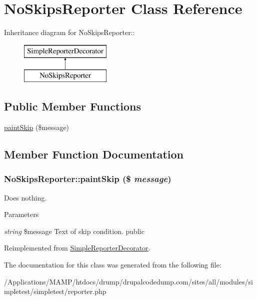 \hypertarget{class_no_skips_reporter}{
\section{NoSkipsReporter Class Reference}
\label{class_no_skips_reporter}
}
Inheritance diagram for NoSkipsReporter::\begin{figure}[H]
\begin{center}
\leavevmode
\includegraphics[height=2cm]{class_no_skips_reporter}
\end{center}
\end{figure}
\subsection*{Public Member Functions}
\begin{DoxyCompactItemize}
\item 
\hyperlink{class_no_skips_reporter_ab632d4c0baf0fc36a44c3ed6c3a3d1a4}{paintSkip} (\$message)
\end{DoxyCompactItemize}


\subsection{Member Function Documentation}
\hypertarget{class_no_skips_reporter_ab632d4c0baf0fc36a44c3ed6c3a3d1a4}{
\subsubsection[{paintSkip}]{\setlength{\rightskip}{0pt plus 5cm}NoSkipsReporter::paintSkip (\$ {\em message})}}
\label{class_no_skips_reporter_ab632d4c0baf0fc36a44c3ed6c3a3d1a4}
Does nothing. 
\begin{DoxyParams}{Parameters}
\item[{\em string}]\$message Text of skip condition.  public \end{DoxyParams}


Reimplemented from \hyperlink{class_simple_reporter_decorator_a40539ad16a5ce944fe4d2ea479bca897}{SimpleReporterDecorator}.

The documentation for this class was generated from the following file:\begin{DoxyCompactItemize}
\item 
/Applications/MAMP/htdocs/drump/drupalcodedump.com/sites/all/modules/simpletest/simpletest/reporter.php\end{DoxyCompactItemize}
